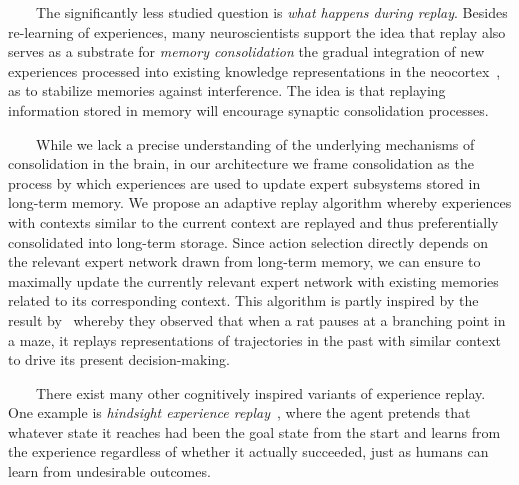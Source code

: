 \begin{center}
\begin{tcolorbox}[breakable,sharp corners=all,coltitle=black,colbacktitle=white,
    width=\textwidth,boxsep=5pt,left=5pt,right=5pt,
    title={\textbf{Box B: Replaying Experience, Consolidating Memory}}]
~~~~The significantly less studied question is \textit{what happens during replay}. Besides re-learning of experiences, many neuroscientists support the idea that replay also serves as a substrate for \textit{memory consolidation} \emdash{} the gradual integration of new experiences processed into existing knowledge representations in the neocortex~\cite{WilsonandMcNaughtonSCIENCE-94,McClellandetalPR-95,KarlssonandFrankNATURE-NEUROSCIENCE-09,BendorandWilsonNATURE-NEUROSCIENCE-12,KumaranetalTiCS-16}, as to stabilize memories against interference. The idea is that replaying information stored in memory will encourage synaptic consolidation processes. 

~~~~While we lack a precise understanding of the underlying mechanisms of consolidation in the brain, in our architecture we frame consolidation as the process by which experiences are used to update expert subsystems stored in long-term memory. We propose an adaptive replay algorithm whereby experiences with contexts similar to the current context are replayed and thus preferentially consolidated into long-term storage. Since action selection directly depends on the relevant expert network drawn from long-term memory, we can ensure to maximally update the currently relevant expert network with existing memories related to its corresponding context. This algorithm is partly inspired by the result by~\cite{JooandFrankNATURE-REVIEWS-NEUROSCIENCE-18} whereby they observed that when a rat pauses at a branching point in a maze, it replays representations of trajectories in the past with similar context to drive its present decision-making. 

~~~~There exist many other cognitively inspired variants of experience replay. One example is {\textit{hindsight experience replay}}~\cite{AndrychowiczetalCoRR-17}, where the agent pretends that whatever state it reaches had been the goal state from the start and learns from the experience regardless of whether it actually succeeded, just as humans can learn from undesirable outcomes. 



  \end{tcolorbox}
\end{center}